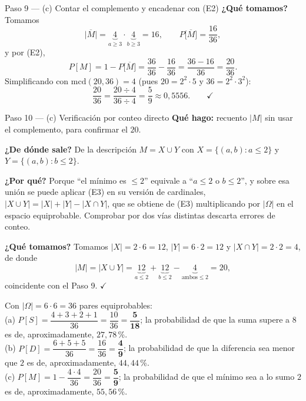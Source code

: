 \documentclass[11pt]{article}
\begin{document}
\begin{sol}
\begin{paso}{Paso 9 --- (c) Contar el complemento y encadenar con (E2)}
\textbf{¿Qué tomamos?} Tomamos
\[
\big|\overline{M}\big|=\underbrace{4}_{a\ge 3}\cdot\underbrace{4}_{b\ge 3}=16,
\qquad
P\big[\overline{M}\big]=\frac{16}{36},
\]
y por (E2),
\[
P[M]=1-P\big[\overline{M}\big]=\frac{36}{36}-\frac{16}{36}=\frac{36-16}{36}=\frac{20}{36}.
\]
Simplificando con $\mathrm{mcd}(20,36)=4$ (pues $20=2^{2}\cdot 5$ y $36=2^{2}\cdot 3^{2}$):
\[
\frac{20}{36}=\frac{20\div 4}{36\div 4}=\frac{5}{9}\approx 0{,}5556 . \qquad\checkmark
\]
\end{paso}

\begin{paso}{Paso 10 --- (c) Verificación por conteo directo}
\textbf{Qué hago:} recuento $|M|$ sin usar el complemento, para confirmar el $20$.

\textbf{¿De dónde sale?} De la descripción $M=X\cup Y$ con $X=\{(a,b):a\le 2\}$ y
$Y=\{(a,b):b\le 2\}$.

\textbf{¿Por qué?} Porque ``el mínimo es $\le 2$'' equivale a ``$a\le 2$ o $b\le 2$'', y sobre
esa unión se puede aplicar (E3) en su versión de cardinales,
$|X\cup Y|=|X|+|Y|-|X\cap Y|$, que se obtiene de (E3) multiplicando por $|\Omega|$ en el espacio
equiprobable. Comprobar por dos vías distintas descarta errores de conteo.

\textbf{¿Qué tomamos?} Tomamos $|X|=2\cdot 6=12$, $|Y|=6\cdot 2=12$ y
$|X\cap Y|=2\cdot 2=4$, de donde
\[
|M|=|X\cup Y|=\underbrace{12}_{a\le 2}+\underbrace{12}_{b\le 2}-\underbrace{4}_{\text{ambos}\le 2}=20 ,
\]
coincidente con el Paso 9. $\checkmark$
\end{paso}

\end{sol}

\begin{resp}
Con $|\Omega|=6\cdot 6=36$ pares equiprobables:\\[4pt]
(a) $P[S]=\dfrac{4+3+2+1}{36}=\dfrac{10}{36}=\mathbf{\dfrac{5}{18}}$; la probabilidad de que la
suma supere a $8$ es de, aproximadamente, $27{,}78$\,\%.\\[4pt]
(b) $P[D]=\dfrac{6+5+5}{36}=\dfrac{16}{36}=\mathbf{\dfrac{4}{9}}$; la probabilidad de que la
diferencia sea menor que $2$ es de, aproximadamente, $44{,}44$\,\%.\\[4pt]
(c) $P[M]=1-\dfrac{4\cdot 4}{36}=\dfrac{20}{36}=\mathbf{\dfrac{5}{9}}$; la probabilidad de que el
mínimo sea a lo sumo $2$ es de, aproximadamente, $55{,}56$\,\%.
\end{resp}

\end{document}
